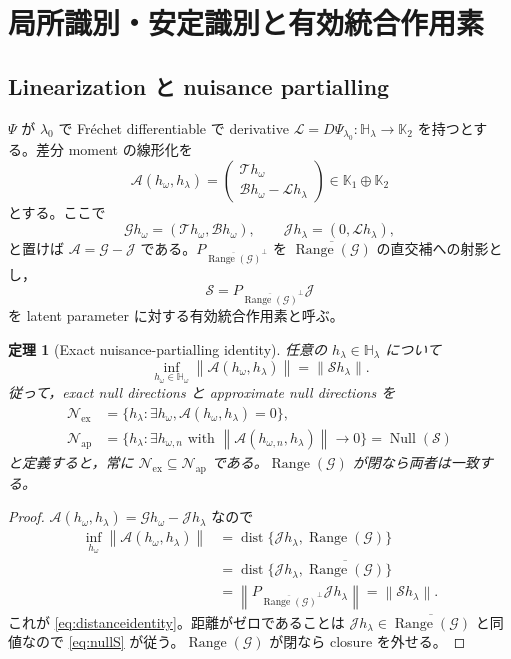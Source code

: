 \documentclass[11pt,a4paper]{ltjsarticle}
\newtheorem{theorem}{定理}[section]
\theoremstyle{remark}
\newcommand{\norm}[1]{\left\lVert#1\right\rVert}
\newcommand{\cN}{\mathcal N}
\newcommand{\Aop}{\mathscr A}
\newcommand{\Top}{\mathscr T}
\newcommand{\Bop}{\mathscr B}
\newcommand{\Lop}{\mathscr L}
\newcommand{\Gop}{\mathscr G}
\newcommand{\Jop}{\mathscr J}
\newcommand{\Sop}{\mathscr S}
\newcommand{\Null}{\operatorname{Null}}
\newcommand{\Range}{\operatorname{Range}}
\newcommand{\dist}{\operatorname{dist}}
\begin{document}
\section{局所識別・安定識別と有効統合作用素}\label{sec:local}

\subsection{Linearization と nuisance partialling}
$\Psi$ が $\lambda_0$ で Fr\'echet differentiable で derivative $\Lop=D\Psi_{\lambda_0}:\mathbb H_\lambda\to\mathbb K_2$ を持つとする。差分 moment の線形化を
\begin{equation}
\Aop(h_\omega,h_\lambda)
=\begin{pmatrix}
\Top h_\omega\\
\Bop h_\omega-\Lop h_\lambda
\end{pmatrix}
\in\mathbb K_1\oplus\mathbb K_2
\label{eq:Adef}
\end{equation}
とする。ここで
\[
\Gop h_\omega=(\Top h_\omega,\Bop h_\omega),
\qquad
\Jop h_\lambda=(0,\Lop h_\lambda),
\]
と置けば $\Aop=\Gop-\Jop$ である。$P_{\overline{\Range(\Gop)}^\perp}$ を $\overline{\Range(\Gop)}$ の直交補への射影とし，
\begin{equation}
\Sop=P_{\overline{\Range(\Gop)}^\perp}\Jop
\label{eq:Seffective}
\end{equation}
を latent parameter に対する有効統合作用素と呼ぶ。

\begin{theorem}[Exact nuisance-partialling identity]\label{thm:partialling}
任意の $h_\lambda\in\mathbb H_\lambda$ について
\begin{equation}
\inf_{h_\omega\in\mathbb H_\omega}
\norm{\Aop(h_\omega,h_\lambda)}
=\norm{\Sop h_\lambda}.
\label{eq:distanceidentity}
\end{equation}
従って，exact null directions と approximate null directions を
\begin{align}
\cN_{\mathrm{ex}}
&=\{h_\lambda:\exists h_\omega,
\Aop(h_\omega,h_\lambda)=0\},
\label{eq:Nex}\\
\cN_{\mathrm{ap}}
&=\{h_\lambda:\exists h_{\omega,n}\text{ with }
\norm{\Aop(h_{\omega,n},h_\lambda)}\to0\}
=\Null(\Sop)
\label{eq:nullS}
\end{align}
と定義すると，常に $\cN_{\mathrm{ex}}\subseteq\cN_{\mathrm{ap}}$ である。$\Range(\Gop)$ が閉なら両者は一致する。
\end{theorem}

\begin{proof}
$\Aop(h_\omega,h_\lambda)=\Gop h_\omega-\Jop h_\lambda$ なので
\begin{align*}
\inf_{h_\omega}\norm{\Aop(h_\omega,h_\lambda)}
&=\dist\{\Jop h_\lambda,\Range(\Gop)\}\\
&=\dist\{\Jop h_\lambda,\overline{\Range(\Gop)}\}\\
&=\norm{P_{\overline{\Range(\Gop)}^\perp}\Jop h_\lambda}
=\norm{\Sop h_\lambda}.
\end{align*}
これが \eqref{eq:distanceidentity}。距離がゼロであることは $\Jop h_\lambda\in\overline{\Range(\Gop)}$ と同値なので \eqref{eq:nullS} が従う。$\Range(\Gop)$ が閉なら closure を外せる。
\end{proof}
\end{document}
